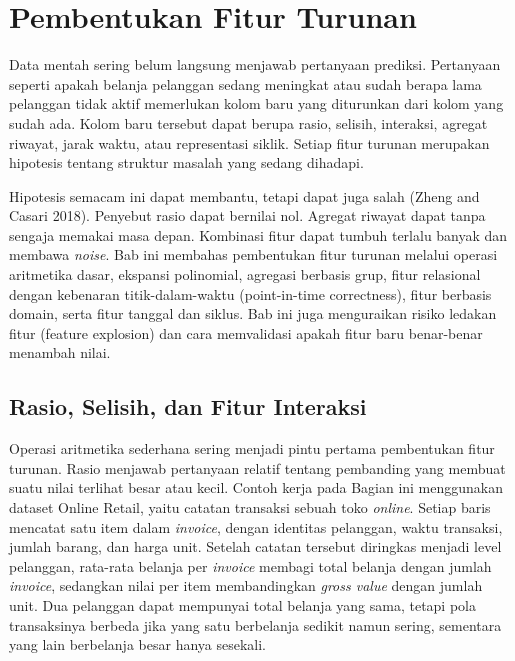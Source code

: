 \chapter{Pembentukan Fitur Turunan}\label{pembentukan-fitur-turunan}

Data mentah sering belum langsung menjawab pertanyaan prediksi. Pertanyaan seperti apakah belanja pelanggan sedang meningkat atau sudah berapa lama pelanggan tidak aktif memerlukan kolom baru yang diturunkan dari kolom yang sudah ada. Kolom baru tersebut dapat berupa rasio, selisih, interaksi, agregat riwayat, jarak waktu, atau representasi siklik. Setiap fitur turunan merupakan hipotesis tentang struktur masalah yang sedang dihadapi.

Hipotesis semacam ini dapat membantu, tetapi dapat juga salah (Zheng and Casari 2018). Penyebut rasio dapat bernilai nol. Agregat riwayat dapat tanpa sengaja memakai masa depan. Kombinasi fitur dapat tumbuh terlalu banyak dan membawa \emph{noise}. Bab ini membahas pembentukan fitur turunan melalui operasi aritmetika dasar, ekspansi polinomial, agregasi berbasis grup, fitur relasional dengan kebenaran titik-dalam-waktu (point-in-time correctness), fitur berbasis domain, serta fitur tanggal dan siklus. Bab ini juga menguraikan risiko ledakan fitur (feature explosion) dan cara memvalidasi apakah fitur baru benar-benar menambah nilai.

\section{Rasio, Selisih, dan Fitur Interaksi}\label{rasio-selisih-dan-fitur-interaksi}

Operasi aritmetika sederhana sering menjadi pintu pertama pembentukan fitur turunan. Rasio menjawab pertanyaan relatif tentang pembanding yang membuat suatu nilai terlihat besar atau kecil. Contoh kerja pada Bagian ini menggunakan dataset Online Retail, yaitu catatan transaksi sebuah toko \emph{online}. Setiap baris mencatat satu item dalam \emph{invoice}, dengan identitas pelanggan, waktu transaksi, jumlah barang, dan harga unit. Setelah catatan tersebut diringkas menjadi level pelanggan, rata-rata belanja per \emph{invoice} membagi total belanja dengan jumlah \emph{invoice}, sedangkan nilai per item membandingkan \emph{gross value} dengan jumlah unit. Dua pelanggan dapat mempunyai total belanja yang sama, tetapi pola transaksinya berbeda jika yang satu berbelanja sedikit namun sering, sementara yang lain berbelanja besar hanya sesekali.

